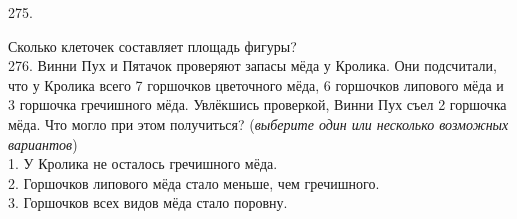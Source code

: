\documentclass[12pt]{article}
\begin{document}
\begin{center}
\begin{figure}[ht!]
\end{figure}
\end{center}
275. \begin{center}
\begin{figure}[ht!]
\end{figure}
\end{center}
Сколько клеточек составляет площадь фигуры?\\
276. Винни Пух и Пятачок проверяют запасы мёда у Кролика. Они подсчитали, что у Кролика всего 7 горшочков цветочного мёда, 6 горшочков липового мёда и 3 горшочка гречишного мёда. Увлёкшись проверкой, Винни Пух съел 2 горшочка мёда. Что могло при этом получиться? ({\it выберите один или несколько возможных вариантов})\\
1. У Кролика не осталось гречишного мёда.\\
2. Горшочков липового мёда стало меньше, чем гречишного.\\
3. Горшочков всех видов мёда стало поровну.\\
\end{document}
